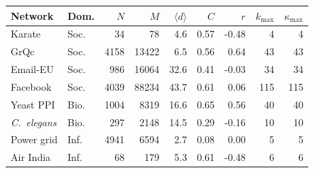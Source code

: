 \setlength{\tabcolsep}{3pt}\footnotesize
\begin{tabular}{llrrrrrrr}
\toprule
Network & Dom. & $N$ & $M$ & $\langle d\rangle$ & $C$ & $r$ & $k_{\max}$ & $\kappa_{\max}$\\
\midrule
Karate & Soc. & \num{34} & \num{78} & 4.6 & 0.57 & -0.48 & 4 & 4\\
GrQc & Soc. & \num{4158} & \num{13422} & 6.5 & 0.56 & 0.64 & 43 & 43\\
Email-EU & Soc. & \num{986} & \num{16064} & 32.6 & 0.41 & -0.03 & 34 & 34\\
Facebook & Soc. & \num{4039} & \num{88234} & 43.7 & 0.61 & 0.06 & 115 & 115\\
\midrule
Yeast PPI & Bio. & \num{1004} & \num{8319} & 16.6 & 0.65 & 0.56 & 40 & 40\\
\emph{C.~elegans} & Bio. & \num{297} & \num{2148} & 14.5 & 0.29 & -0.16 & 10 & 10\\
\midrule
Power grid & Inf. & \num{4941} & \num{6594} & 2.7 & 0.08 & 0.00 & 5 & 5\\
Air India & Inf. & \num{68} & \num{179} & 5.3 & 0.61 & -0.48 & 6 & 6\\
\bottomrule
\end{tabular}